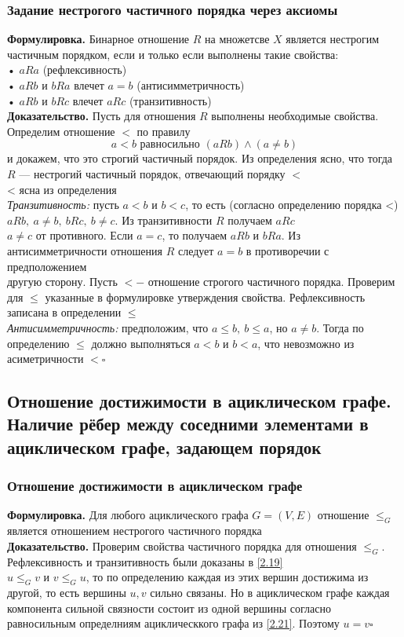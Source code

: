 \documentclass[a4paper]{article}
\newcommand{\qed}{\hfill$\square$}
\begin{document}
\subsubsection*{Задание нестрогого частичного порядка через аксиомы}
\textbf{Формулировка.} Бинарное отношение $R$ на множетсве $X$ является нестрогим частичным порядком, если и только если выполнены такие свойства:\\[2mm]
\indent• $aRa$ (рефлексивность)\\[2mm]
\indent• $aRb$ и $bRa$ влечет $a=b$ (антисимметричность)\\[2mm]
\indent• $aRb$ и $bRc$ влечет $aRc$ (транзитивность)\\[2mm]
\indent\textbf{Доказательство.} Пусть для отношения $R$ выполнены необходимые свойства. Определим отношение $<$ по правилу$$a<b \text { равносильно }(a R b) \wedge(a \neq b)$$
и докажем, что это строгий частичный порядок. Из определения ясно, что тогда $R$ — нестрогий частичный порядок, отвечающий порядку $<$\\[2mm]
 < ясна из определения\\
\indent\textit{Транзитивность:} пусть $a<b$ и $b<c$, то есть (согласно определению порядка <) $aRb,\ a\neq b,\ bRc,\ b\neq c$. Из транзитивности $R$ получаем $aRc$\\
 $a\neq c$ от противного. Если $a=c$, то получаем $aRb$ и $bRa$. Из антисимметричности отношения $R$ следует $a=b$ в противоречии с предположением\\[2mm]
 другую сторону. Пусть $<-$ отношение строгого частичного порядка. Проверим для $\leqslant$ указанные в формулировке утверждения свойства. Рефлексивность записана в определении $\leqslant$\\[2mm]
\indent\textit{Антисимметричность:} предположим, что $a \leqslant b,\ b \leqslant a$, но $a \neq b$. Тогда по определению $\leqslant$ должно выполняться $a<b$ и $b<a$, что невозможно из асиметричности $<$\qed


\subsection{Отношение достижимости в ациклическом графе. Наличие рёбер между соседними элементами в ациклическом графе, задающем порядок}
\subsubsection*{Отношение достижимости в ациклическом графе }
\textbf{Формулировка.} Для любого ациклического графа $G = (V,E)$ отношение $\leqslant_G$ является отношением нестрогого частичного порядка\\[2mm]
\indent\textbf{Доказательство.} Проверим свойства частичного порядка для отношения $\leqslant_G$. Рефлексивность и транзитивность были доказаны в \ref{2.19}\\[2mm]
 $u \leqslant_G v$ и $v  \leqslant_G u$, то по определению каждая из этих вершин достижима из другой, то есть вершины $u, v$ сильно связаны. Но в ациклическом графе каждая компонента сильной связности состоит из одной вершины согласно равносильным определниям ациклическкого графа из \ref{2.21}. Поэтому $u = v$\qed
\end{document}
